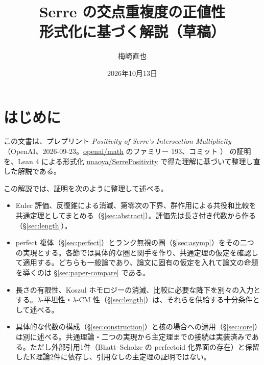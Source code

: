 \documentclass[11pt,a4paper]{ltjsarticle}
\title{Serre の交点重複度の正値性\\[2pt]\large 形式化に基づく解説（草稿）}
\author{梅崎直也}
\date{2026年10月13日}
\numberwithin{equation}{section}
\theoremstyle{plain}
\theoremstyle{definition}
\theoremstyle{definition}
\newcommand{\ld}[1]{\path{#1}}
\begin{document}
\maketitle

\section*{はじめに}

この文書は、プレプリント \emph{Positivity of Serre's Intersection Multiplicity}
（OpenAI、2026-09-23。\href{https://github.com/openai/math}{openai/math} のファミリー 193、コミット \ld{adc7f124}）
の証明を、Lean 4 による形式化
\href{https://github.com/unaoya/SerrePositivity}{unaoya/SerrePositivity}
で得た理解に基づいて整理し直した解説である。

この解説では、証明を次のように整理して述べる。
\begin{itemize}
  \item Euler 評価、反復錐による消滅、第零次の下界、群作用による共役和比較を共通定理としてまとめる（§\ref{sec:abstract}）。評価先は長さ付き代数から作る（§\ref{sec:length}）。
  \item perfect 複体（§\ref{sec:perfect}）とランク無視の圏（§\ref{sec:asymp}）をその二つの実現とする。各節では具体的な圏と関手を作り、共通定理の仮定を確認して適用する。どちらも一般論であり、論文に固有の仮定を入れて論文の命題を導くのは §\ref{sec:paper-compare} である。
  \item 長さの有限性、Koszul ホモロジーの消滅、比較に必要な降下を別々の入力とする。$\lambda$-平坦性・$\lambda$-CM 性（§\ref{sec:length}）は、それらを供給する十分条件として述べる。
  \item 具体的な代数の構成（§\ref{sec:construction}）と核の場合への適用（§\ref{sec:core}）は別に述べる。共通理論・二つの実現から主定理までの接続は実装済みである。ただし外部引用1件（Bhatt--Scholze の perfectoid 化界面の存在）と保留したK理論2件に依存し、引用なしの主定理の証明ではない。
\end{itemize}
\end{document}
